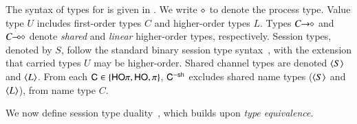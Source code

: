 \documentclass[preprint,11pt]{elsarticle}
\begin{document}
The syntax of types for \HOp is given in . We write $\diamond$ to denote the process type.
Value type $U$ includes
  first-order types $C$ and  higher-order
types $L$.
Types $C\!\! \rightarrow\!\! \diamond$ and $C\!\! \multimap\!\! \diamond$ denote
{\em shared} and {\em linear} higher-order 
types, respectively.
Session types, denoted by $S$, follow the standard binary session type syntax~\cite{honda.vasconcelos.kubo:language-primitives}, with
the extension that carried types $U$ may be higher-order.
Shared channel types are denoted $\langle S \rangle$ and $\langle L \rangle$.
From each $\mathsf{C} \in \{\mathsf{HO}\pi, \mathsf{HO}, \pi \}$, $\mathsf{C}^{-\mathsf{sh}}$ 
excludes shared name types ($\langle S \rangle$ and $\langle L \rangle$), 
from name type $C$.

We now  define session type duality~\cite{TGC14}, which builds upon \emph{type equivalence}.
\end{document}
